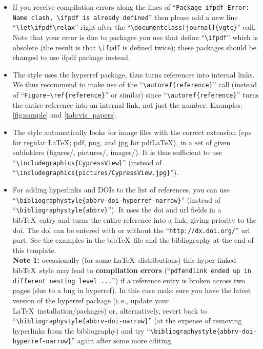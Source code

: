 \documentclass{vgtc}                          %
\begin{document}
\begin{itemize}
\item If you receive compilation errors along the lines of ``\texttt{Package ifpdf Error: Name clash, \textbackslash ifpdf is already defined}'' then please add a new line ``\texttt{\textbackslash let\textbackslash ifpdf\textbackslash relax}'' right after the ``\texttt{\textbackslash documentclass[journal]\{vgtc\}}'' call. Note that your error is due to packages you use that define ``\texttt{\textbackslash ifpdf}'' which is obsolete (the result is that \texttt{\textbackslash ifpdf} is defined twice); these packages should be changed to use ifpdf package instead.
\item The style uses the hyperref package, thus turns references into internal links. We thus recommend to make use of the ``\texttt{\textbackslash autoref\{reference\}}'' call (instead of ``\texttt{Figure\~{}\textbackslash ref\{reference\}}'' or similar) since ``\texttt{\textbackslash autoref\{reference\}}'' turns the entire reference into an internal link, not just the number. Examples: \autoref{fig:sample} and \autoref{tab:vis_papers}.
\item The style automatically looks for image files with the correct extension (eps for regular \LaTeX; pdf, png, and jpg for pdf\LaTeX), in a set of given subfolders (figures/, pictures/, images/). It is thus sufficient to use ``\texttt{\textbackslash includegraphics\{CypressView\}}'' (instead of ``\texttt{\textbackslash includegraphics\{pictures/CypressView.jpg\}}'').
\item For adding hyperlinks and DOIs to the list of references, you can use ``\texttt{\textbackslash bibliographystyle\{abbrv-doi-hyperref-narrow\}}'' (instead of ``\texttt{\textbackslash bibliographystyle\{abbrv\}}''). It uses the doi and url fields in a bib\TeX\ entry and turns the entire reference into a link, giving priority to the doi. The doi can be entered with or without the ``\texttt{http://dx.doi.org/}'' url part. See the examples in the bib\TeX\ file and the bibliography at the end of this template.\\[1em]
\textbf{Note 1:} occasionally (for some \LaTeX\ distributions) this hyper-linked bib\TeX\ style may lead to \textbf{compilation errors} (``\texttt{pdfendlink ended up in different nesting level ...}'') if a reference entry is broken across two pages (due to a bug in hyperref). In this case make sure you have the latest version of the hyperref package (i.\,e., update your \LaTeX\ installation/packages) or, alternatively, revert back to ``\texttt{\textbackslash bibliographystyle\{abbrv-doi-narrow\}}'' (at the expense of removing hyperlinks from the bibliography) and try ``\texttt{\textbackslash bibliographystyle\{abbrv-doi-hyperref-narrow\}}'' again after some more editing.\\[1em]

\end{itemize}
\end{document}
